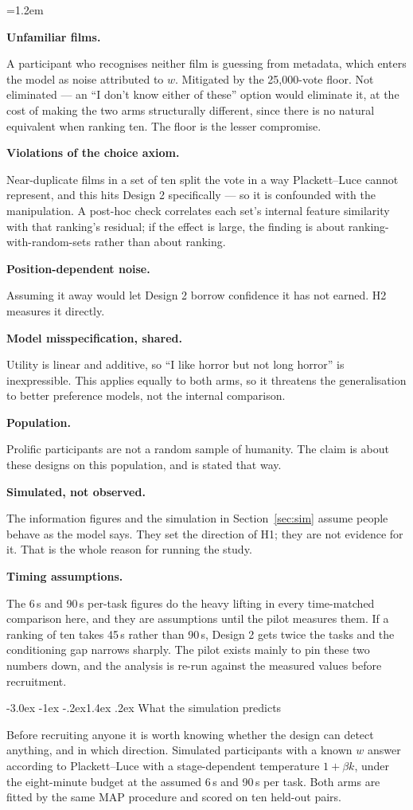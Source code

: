 \documentclass[11pt,a4paper]{article}
\makeatletter
\renewcommand\subsection{\@startsection{subsection}{2}{\z@}%
  {-3.0ex \@plus -1ex \@minus -.2ex}{1.4ex \@plus .2ex}%
  {\normalfont\large\sffamily\bfseries\color{accent}}}
\newcommand{\term}[1]{\par\medskip\noindent\textbf{#1}\par\nopagebreak\vspace{0.15em}}
\newenvironment{terms}{\par\begingroup\leftskip=1.2em}{\par\endgroup\medskip}
\makeatother
\begin{document}
\begin{terms}
\term{Unfamiliar films.} A participant who recognises neither film is guessing
  from metadata, which enters the model as noise attributed to $w$. Mitigated by
  the 25{,}000-vote floor. Not eliminated --- an ``I don't know either of these''
  option would eliminate it, at the cost of making the two arms structurally
  different, since there is no natural equivalent when ranking ten. The floor is
  the lesser compromise.
\term{Violations of the choice axiom.} Near-duplicate films in a set of ten
  split the vote in a way Plackett--Luce cannot represent, and this hits Design 2
  specifically --- so it is confounded with the manipulation. A post-hoc check
  correlates each set's internal feature similarity with that ranking's residual;
  if the effect is large, the finding is about ranking-with-random-sets rather
  than about ranking.
\term{Position-dependent noise.} Assuming it away would let Design 2 borrow
  confidence it has not earned. H2 measures it directly.
\term{Model misspecification, shared.} Utility is linear and additive, so
  ``I like horror but not long horror'' is inexpressible. This applies equally to
  both arms, so it threatens the generalisation to better preference models, not
  the internal comparison.
\term{Population.} Prolific participants are not a random sample of humanity.
  The claim is about these designs on this population, and is stated that way.
\term{Simulated, not observed.} The information figures and the simulation in
  Section~\ref{sec:sim} assume people behave as the model says. They set the
  direction of H1; they are not evidence for it. That is the whole reason for
  running the study.
\term{Timing assumptions.} The 6\,s and 90\,s per-task figures do the heavy
  lifting in every time-matched comparison here, and they are assumptions until
  the pilot measures them. If a ranking of ten takes 45\,s rather than 90\,s,
  Design 2 gets twice the tasks and the conditioning gap narrows sharply. The
  pilot exists mainly to pin these two numbers down, and the analysis is
  re-run against the measured values before recruitment.
\end{terms}

\subsection{What the simulation predicts}
\label{sec:sim}

Before recruiting anyone it is worth knowing whether the design can detect
anything, and in which direction. Simulated participants with a known $w$ answer
according to Plackett--Luce with a stage-dependent temperature $1 + \beta k$,
under the eight-minute budget at the assumed 6\,s and 90\,s per task. Both arms
are fitted by the same MAP procedure and scored on ten held-out pairs.
\end{document}
